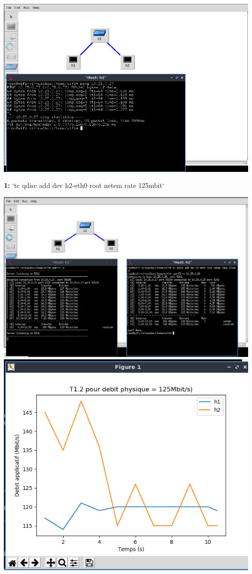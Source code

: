 \vspace{0.5cm}
\begin{center}
    \includegraphics[width=1\textwidth]{./images/T1.2TopologyAndPing.png}
\end{center}
\textbf{1:} `tc qdisc add dev h2-eth0 root netem rate 125mbit`
\begin{center}
    \includegraphics[width=1\textwidth]{./images/T1.2/125test2.png}
    \includegraphics[width=1\textwidth]{./images/T1.2/courbe125test2.png}
    
\end{center}

